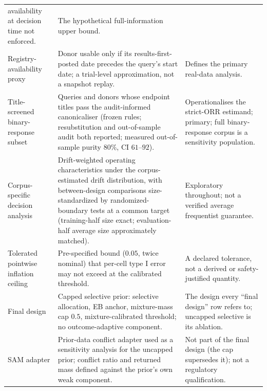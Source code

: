 \documentclass[11pt]{article}
\begin{document}
\begin{longtable}{p{} p{} p{}}
availability at decision time not enforced. & The hypothetical
full-information upper bound. \\
Registry-availability proxy & Donor usable only if its results-first-posted
date precedes the query's start date; a trial-level approximation, not a
snapshot replay. & Defines the primary real-data analysis. \\
Title-screened binary-response subset & Queries and donors whose endpoint titles pass
the audit-informed canonicaliser (frozen rules; resubstitution and
out-of-sample audit both reported; measured out-of-sample purity $80\%$,
CI $61$--$92$). & Operationalises the strict-ORR
estimand; primary; full binary-response corpus is a sensitivity
population. \\
Corpus-specific decision analysis & Drift-weighted operating
characteristics under the corpus-estimated drift distribution, with
between-design comparisons size-standardized by randomized-boundary
tests at a common target (training-half size exact; evaluation-half
average size approximately matched). & Exploratory throughout; not a
verified average frequentist guarantee. \\
Tolerated pointwise inflation ceiling & Pre-specified bound ($0.05$, twice
nominal) that per-cell type I error may not exceed at the calibrated
threshold. & A declared tolerance, not a derived or safety-justified
quantity. \\
Final design & Capped selective prior: selective allocation, EB anchor,
mixture-mass cap $0.5$, mixture-calibrated threshold; no outcome-adaptive
component. & The design every ``final design'' row refers to; uncapped
selective is its ablation. \\
SAM adapter & Prior-data conflict adapter used as a sensitivity analysis for
the uncapped prior; conflict ratio and returned mass defined against the
prior's own weak component. & Not part of the final design (the cap
supersedes it); not a regulatory qualification. \\
\bottomrule
\end{longtable}

\end{document}
